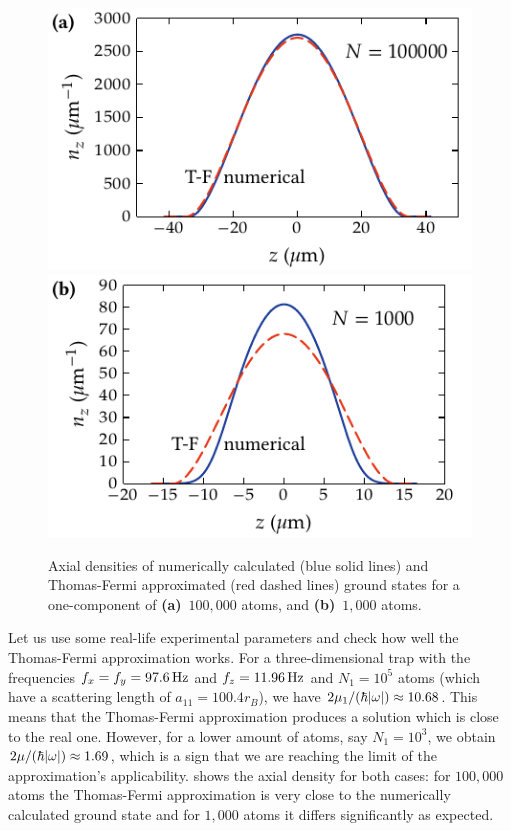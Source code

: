 \begin{figure}
\centerline{%
	\includegraphics{figures_generated/mean_field/one_comp_gs_large.pdf}%
	\includegraphics{figures_generated/mean_field/one_comp_gs_small.pdf}}
\caption[Numerically calculated and Thomas-Fermi approximated ground states]{
Axial densities of numerically calculated (blue solid lines) and Thomas-Fermi approximated (red dashed lines) ground states for a one-component \Rb{}  of \textbf{(a)}~$100,000$ atoms, and \textbf{(b)}~$1,000$ atoms.}%
\label{fig:bec-noise:mean-field:tf-vs-accurate}
\end{figure}

Let us use some real-life experimental parameters and check how well the Thomas-Fermi approximation works.
For a three-dimensional trap with the frequencies $f_x = f_y = 97.6\mbox{\ensuremath{\,\mathrm{Hz}}}$ and $f_z = 11.96\mbox{\ensuremath{\,\mathrm{Hz}}}$ and $N_1=10^5$ \Rb{} atoms (which have a scattering length of $a_{11} = 100.4 r_B$), we have $2 \mu_1 / (\hbar |\mathbf{\omega}|) \approx 10.68$.
This means that the Thomas-Fermi approximation produces a solution which is close to the real one.
However, for a lower amount of atoms, say $N_1=10^3$, we obtain $2 \mu / (\hbar |\mathbf{\omega}|) \approx 1.69$, which is a sign that we are reaching the limit of the approximation's applicability.
 shows the axial density for both cases: for $100,000$ atoms the Thomas-Fermi approximation is very close to the numerically calculated ground state and for $1,000$ atoms it differs significantly as expected.

